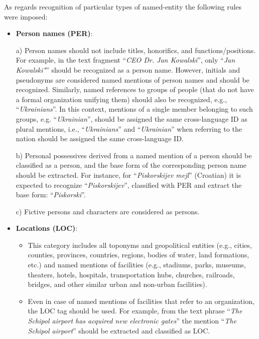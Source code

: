 \documentclass[11pt]{article}
\begin{document}
As regards recognition of particular types of named-entity the following rules were imposed:

\begin{itemize}

\item \textbf{Person names (PER)}:

  a) Person names should not include titles, honorifics, and functions/positions. For example, in the text fragment ``\textit{CEO Dr. Jan Kowalski}'', only ``\textit{Jan Kowalski"}'' should be recognized as a person name. However, initials and pseudonyms are considered named mentions of person names and should be recognized. Similarly, named references to groups of people (that do not have a formal organization unifying them) should also be recognized, e.g., ``\textit{Ukrainians}''. In this context, mentions of a single member belonging to such groups, e.g. ``\textit{Ukrainian}'', should be assigned the same cross-language ID as plural mentions, i.e., ``\textit{Ukrainians}'' and
``\textit{Ukrainian}'' when referring to the nation should be assigned the same cross-language ID.	

  b) Personal possessives derived from a named mention of a person should
  be classified as a person, and the base form of the corresponding
  person name should be extracted. For instance, for
  ``\textit{Piskorskijev mejl}'' (Croatian) it is expected to recognize
  ``\textit{Piskorskijev}'', classified with PER and extract the base
  form: ``\textit{Piskorski}''.

  c) Fictive persons and characters are considered as persons.

\item \textbf{Locations (LOC)}:

  \begin{itemize}

  \item This category includes all toponyms and geopolitical entities
    (e.g., cities, counties, provinces, countries, regions, bodies of
    water, land formations, etc.) and named mentions of facilities (e.g.,
    stadiums, parks, museums, theaters, hotels, hospitals, transportation
    hubs, churches, railroads, bridges, and other similar urban and
    non-urban facilities).

  \item Even in case of named mentions of facilities that refer to an
    organization, the LOC tag should be used. For example, from the text
    phrase ``\textit{The Schipol airport has acquired new electronic
      gates}'' the mention ``\textit{The Schipol airport}'' should be
    extracted and classified as LOC.


\end{itemize}
\end{itemize}
\end{document}
